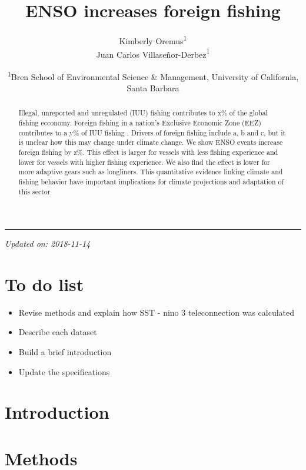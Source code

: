 \documentclass[]{article}
\title{ENSO increases foreign fishing}
\author{Kimberly Oremus\textsuperscript{1} \\ Juan Carlos Villaseñor-Derbez\textsuperscript{1}}
\date{\textsuperscript{1}Bren School of Environmental Science \& Management,
University of California, Santa Barbara}
\providecommand{\tightlist}{%
  \setlength{\itemsep}{0pt}\setlength{\parskip}{0pt}}
\begin{document}
\maketitle
\begin{abstract}
Illegal, unreported and unregulated (IUU) fishing contributes to x\% of
the global fishing ecconomy. Foreign fishing in a nation's Exclusive
Economic Zone (EEZ) contributes to a y\% of IUU fishing
\citep{cabral_2018}. Drivers of foreign fishing include a, b and c, but
it is unclear how this may change under climate change. We show ENSO
events increase foreign fishing by z\%. This effect is larger for
vessels with less fishing experience and lower for vessels with higher
fishing experience. We also find the effect is lower for more adaptive
gears such as longliners. This quantitative evidence linking climate and
fishing behavior have important implications for climate projections and
adaptation of this sector
\end{abstract}

{
\setcounter{tocdepth}{4}
\tableofcontents
}
\begin{center}\rule{0.5\linewidth}{\linethickness}\end{center}

\emph{Updated on: 2018-11-14}

\hypertarget{to-do-list}{%
\section{To do list}\label{to-do-list}}

\begin{itemize}
\tightlist
\item
  Revise methods and explain how SST - nino 3 teleconnection was
  calculated
\item
  Describe each dataset
\item
  Build a brief introduction
\item
  Update the specifications
\end{itemize}

\clearpage

\hypertarget{introduction}{%
\section{Introduction}\label{introduction}}

\hypertarget{methods}{%
\section{Methods}\label{methods}}
\end{document}
